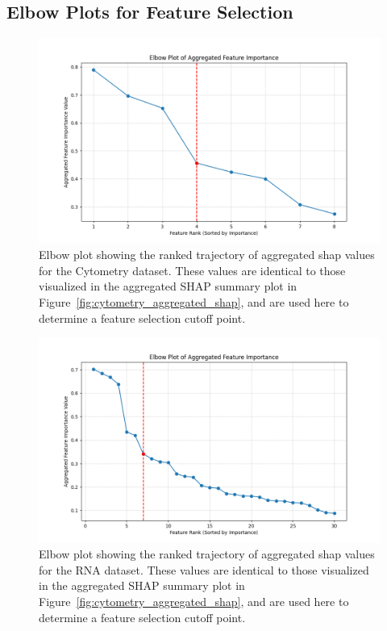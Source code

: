 \documentclass[12pt,a4paper]{report}
\begin{document}
\subsection{Elbow Plots for Feature Selection}
\label{appendix:elbow_plots}

\begin{figure}[h!]
    \centering
    \includegraphics[width=\textwidth]{images/elbow_plot_cytometry_uncompressed.png}
    \caption[Elbow plot for Cytometry]{Elbow plot showing the ranked trajectory of aggregated \gls{shap} values for the Cytometry dataset. These values are identical to those visualized in the aggregated SHAP summary plot in Figure~\ref{fig:cytometry_aggregated_shap}, and are used here to determine a feature selection cutoff point.}
    \label{fig:elbow_plot_cytomery_uncompressed}
\end{figure}

\begin{figure}[h!]
    \centering
    \includegraphics[width=\textwidth]{images/elbow_plot_rna_uncompressed.png}
    \caption[Elbow plot for RNA]{Elbow plot showing the ranked trajectory of aggregated \gls{shap} values for the RNA dataset. These values are identical to those visualized in the aggregated SHAP summary plot in Figure~\ref{fig:cytometry_aggregated_shap}, and are used here to determine a feature selection cutoff point.}
    \label{fig:elbow_plot_rna_uncompressed}
\end{figure}





\end{document}
